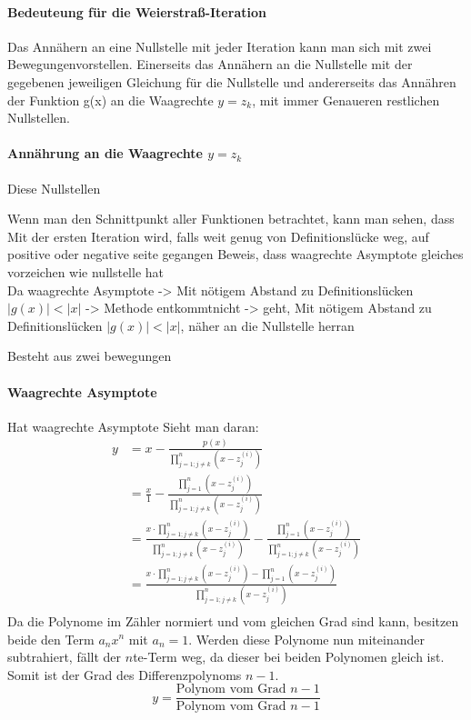 \documentclass[12pt]{article}
\begin{document}
\paragraph{Bedeuteung für die Weierstraß-Iteration}
Das Annähern an eine Nullstelle mit jeder Iteration kann man sich mit zwei \glqq Bewegungen\grqq\space vorstellen. Einerseits das Annähern an die Nullstelle mit der gegebenen jeweiligen Gleichung für die Nullstelle und andererseits das Annähren der Funktion g(x) an die Waagrechte $y=z_k$, mit immer Genaueren restlichen Nullstellen.

\paragraph{Annährung an die Waagrechte $y=z_k$}
Diese Nullstellen 

Wenn man den Schnittpunkt aller Funktionen betrachtet, kann man sehen, dass 
Mit der ersten Iteration wird, falls weit genug von Definitionslücke weg, auf positive oder negative seite gegangen
    Beweis, dass waagrechte Asymptote gleiches vorzeichen wie nullstelle hat
\\
Da waagrechte Asymptote -> Mit nötigem Abstand zu Definitionslücken $|g(x)|<|x|$
-> Methode \glqq entkommt\grqq\space nicht
-> geht, Mit nötigem Abstand zu Definitionslücken $|g(x)|<|x|$, näher an die Nullstelle herran

Besteht aus zwei bewegungen
\paragraph{Waagrechte Asymptote}
Hat waagrechte Asymptote
Sieht man daran:
\begin{align*}
    y &= x - \frac{p(x)}{\prod_{j=1;j\neq k}^{n} (x-z_j^{(i)})} \\
    &= \frac{x}{1} - \frac{\prod_{j=1}^{n} (x-z_j^{(i)})}{\prod_{j=1;j\neq k}^{n} (x-z_j^{(i)})} \\
    &= \frac{x \cdot \prod_{j=1;j\neq k}^{n} (x-z_j^{(i)})}{\prod_{j=1;j\neq k}^{n} (x-z_j^{(i)})} - \frac{\prod_{j=1}^{n} (x-z_j^{(i)})}{\prod_{j=1;j\neq k}^{n} (x-z_j^{(i)})} \\
    &= \frac{x \cdot \prod_{j=1;j\neq k}^{n} (x-z_j^{(i)}) - \prod_{j=1}^{n} (x-z_j^{(i)})}{\prod_{j=1;j\neq k}^{n} (x-z_j^{(i)})} \\
\end{align*}
Da die Polynome im Zähler normiert und vom gleichen Grad sind kann, besitzen beide den Term $a_nx^n$ mit $a_n = 1$. Werden diese Polynome nun miteinander subtrahiert, fällt der $n$te-Term weg, da dieser bei beiden Polynomen gleich ist. Somit ist der Grad des Differenzpolynoms $n-1$. \\
\begin{equation*}
    y = \frac{\text{Polynom vom Grad }n-1}{\text{Polynom vom Grad }n-1}
\end{equation*}
\end{document}

